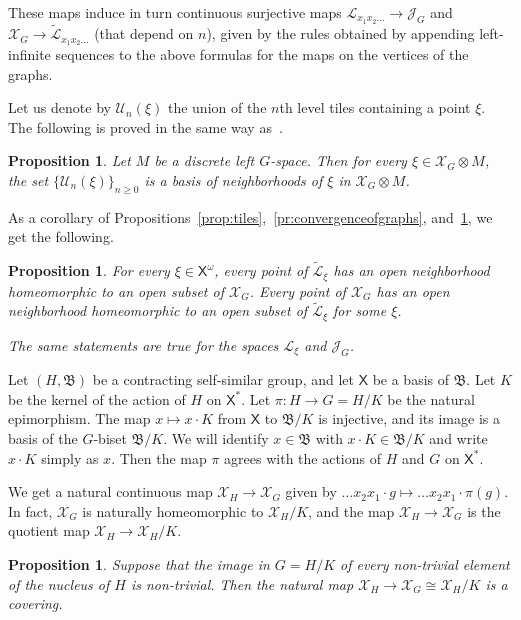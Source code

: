 \documentclass[11pt]{amsart}
\newcommand{\bim}{\mathfrak{B}}
\newcommand{\arr}{\longrightarrow}
\newcommand{\lims}[1][G]{\mathcal{J}_{#1}}
\newcommand{\limg}[1][G]{\mathcal{X}_{#1}}
\newcommand{\xs}{\alb^\ast}
\newcommand{\xo}{\alb^\omega}
\newcommand{\leaf}{\mathcal{L}}
\newcommand{\leaftilde}{\widetilde{\leaf}}
\newcommand{\alb}{\ensuremath{\mathsf{X}}}%
\theoremstyle{definition}
\theoremstyle{plain}
\newtheorem{main thm}{Theorem}
\newtheorem{prop}[defin]{Proposition}
\theoremstyle{remark}
\theoremstyle{plain}
\begin{document}
These maps induce in turn continuous surjective maps $\leaf_{x_1x_2\ldots}\arr\lims$ and $\limg\arr\leaftilde_{x_1x_2\ldots}$ (that depend on $n$), given by the rules obtained by appending left-infinite sequences to the above formulas for the maps on the vertices of the graphs.




Let us denote by $\mathcal{U}_n(\xi)$ the union of the $n$th level tiles containing a point $\xi$. The following is proved in the same way as~\cite[Proposition~3.4.1]{Nek:book}.

\begin{prop}
\label{pr:basisofnbhd}
    Let $M$ be a discrete left $G$-space. Then for every $\xi\in\limg\otimes M$, the set $\{\mathcal{U}_n(\xi)\}_{n\ge 0}$ is a basis of neighborhoods of $\xi$ in $\limg\otimes M$.
\end{prop}

As a corollary of Propositions~\ref{prop:tiles},~\ref{pr:convergenceofgraphs}, and~\ref{pr:basisofnbhd}, we get the following.

\begin{prop}
    \label{pr:localhomeomorphism}
For every $\xi\in\xo$, every point of $\leaftilde_\xi$ has an open neighborhood homeomorphic to an open subset of $\limg$. Every point of $\limg$ has an open neighborhood homeomorphic to an open subset of $\leaftilde_\xi$ for some $\xi$.

The same statements are true for the spaces $\leaf_\xi$ and $\lims$.
\end{prop}

Let $(H, \bim)$ be a contracting self-similar group, and let $\alb$ be a basis of $\bim$. Let $K$ be the kernel of the action of $H$ on $\xs$. Let $\pi\colon H\arr G=H/K$ be the natural epimorphism. The map $x\mapsto x\cdot K$ from $\alb$ to $\bim/K$ is injective, and its image is a basis of the $G$-biset $\bim/K$. We will identify $x\in\bim$ with $x\cdot K\in\bim/K$ and write $x\cdot K$ simply as $x$. Then the map $\pi$ agrees with the actions of $H$ and $G$ on $\xs$.

We get a natural continuous map $\limg[H]\arr\limg$ given by $\ldots x_2x_1\cdot g\mapsto\ldots x_2x_1\cdot\pi(g)$. In fact, $\limg$ is naturally homeomorphic to $\limg[H]/K$, and the map $\limg[H]\arr\limg$ is the quotient map $\limg[H]\arr\limg[H]/K$.


\begin{prop}
\label{pr:limgH}
 Suppose that the image in $G=H/K$ of every non-trivial element of the nucleus of $H$ is non-trivial. Then the natural map $\limg[H]\arr\limg\cong\limg[H]/K$ is a covering.
\end{prop}
\end{document}
